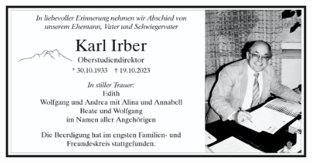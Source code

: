 
\setlength{\fboxsep}{3pt}  %
\setlength{\fboxrule}{1mm} %

\begin{figure}[h!]
	\begin{center}
		
		\vspace*{1cm}
		
		\includegraphics[width=.95\linewidth]{./Todesanzeigen/2023.10.19 Karl Irbner NEU.png} 
	\end{center}
\end{figure}




\newpage


